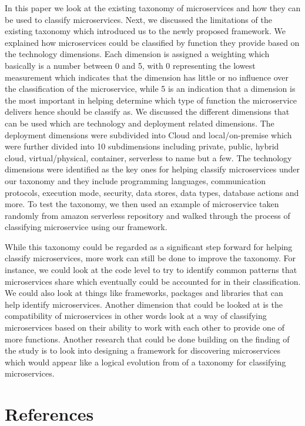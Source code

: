 \documentclass{article}
\begin{document}
In this paper we look at the existing taxonomy of microservices and how they can be used to classify microservices. Next, we discussed the limitations of the existing taxonomy which introduced us to the newly proposed framework. We explained how microservices could be classified by function they provide based on the technology dimensions. Each dimension is assigned a weighting which basically is a number between 0 and 5, with 0 representing the lowest measurement which indicates that the dimension has little or no influence over the classification of the microservice, while 5 is an indication that a dimension is the most important in helping determine which type of function the microservice delivers hence should be classify as. We discussed the different dimensions that can be used which are technology and deployment related dimensions. The deployment dimensions were subdivided into Cloud and local/on-premise which were further divided into 10 subdimensions including private, public, hybrid cloud, virtual/physical, container, serverless to name but a few. The technology dimensions were identified as the key ones for helping classify microservices under our taxonomy and they include programming languages, communication protocols, execution mode, security, data stores, data types, database actions and more. To test the taxonomy, we then used an example of microservice taken randomly from amazon serverless repository and walked through the process of classifying microservice using our framework. 

While this taxonomy could be regarded as a significant step forward for helping classify microservices, more work can still be done to improve the taxonomy. For instance, we could look at the code level to try to identify common patterns that microservices share which eventually could be accounted for in their classification. We could also look at things like frameworks, packages and libraries that can help identify microservices. Another dimension that could be looked at is the compatibility of microservices in other words look at a way of classifying microservices based on their ability to work with each other to provide one of more functions. Another research that could be done building on the finding of the study is to look into designing a framework for discovering microservices which would appear like a logical evolution from of a taxonomy for classifying microservices.

\pagebreak 
\section{References}
\end{document}
